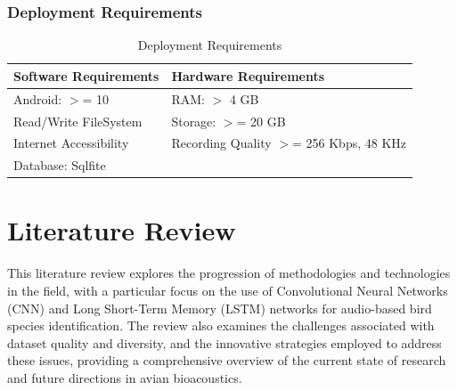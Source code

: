 \subsection{Deployment Requirements}
\begin{table}[ht]
    \centering
    \caption{Deployment Requirements}
    \begin{tabular}{|l|l|}
        \hline
        \textbf{Software Requirements} & \textbf{Hardware Requirements}
        \\ \hline
        Android: \(>\)= 10             & RAM: \(>\) 4 GB
        \\ \hline
        Read/Write FileSystem          & Storage: \(>\)= 20 GB
        \\ \hline
        Internet Accessibility         & Recording Quality \(>\)= 256 Kbps, 48
        KHz
        \\ \hline
        Database: Sqlfite              &                                       \\ \hline
    \end{tabular}
\end{table}

\chapter{Literature Review}

This literature review explores the progression of methodologies and
technologies in the field, with a particular focus on the use of Convolutional
Neural Networks (CNN) and Long Short-Term Memory (LSTM) networks for
audio-based bird species identification. The review also examines the
challenges associated with dataset quality and diversity, and the innovative
strategies employed to address these issues, providing a comprehensive overview
of the current state of research and future directions in avian bioacoustics.

